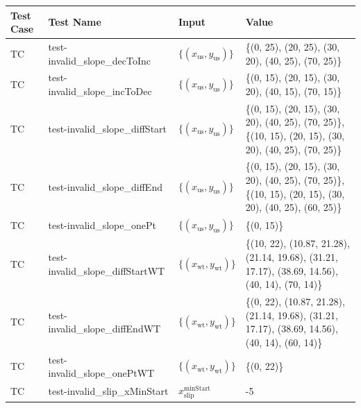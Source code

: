 \documentclass[12pt, titlepage]{article}
\newcounter{testnum} %
\begin{document}
\begin{longtable}{  l  p{5cm}  l  p{5cm}  }
	\hline
	\textbf{Test Case} & \textbf{Test Name} & \textbf{Input} & \textbf{Value} \\
	\hline
	TC{testnum}\thetestnum \label{TC_InvalidSlopeDecToInc} & 
	test-invalid\_slope\_decToInc & 
	$\{\left(x_\text{us},y_\text{us}\right)\}$ & \{(0, 25), (20, 25), (30, 20), 
	(40, 25), 
	(70, 25)\}\\ 
	\hline
	TC{testnum}\thetestnum \label{TC_InvalidSlopeIncToDec} & 
	test-invalid\_slope\_incToDec & 
	$\{\left(x_\text{us},y_\text{us}\right)\}$ & \{(0, 15), (20, 15), (30, 20), 
	(40, 15), 
	(70, 15)\}\\ 
	\hline
	TC{testnum}\thetestnum \label{TC_InvalidSlopeDiffStart} & 
	test-invalid\_slope\_diffStart & 
	$\{\left(x_\text{us},y_\text{us}\right)\}$ & \{(0, 15), (20, 15), (30, 20), 
	(40, 25), 
	(70, 25)\}, \{(10, 15), (20, 15), (30, 20), (40, 25), (70, 25)\}\\ 
	\hline
	TC{testnum}\thetestnum \label{TC_InvalidSlopeDiffEnd} & 
	test-invalid\_slope\_diffEnd & 
	$\{\left(x_\text{us},y_\text{us}\right)\}$ & \{(0, 15), (20, 15), (30, 20), 
	(40, 25), 
	(70, 25)\}, \{(10, 15), (20, 15), (30, 20), (40, 25), (60, 25)\}\\ 
	\hline
	TC{testnum}\thetestnum \label{TC_InvalidSlopeOnePt} & 
	test-invalid\_slope\_onePt & 
	$\{\left(x_\text{us},y_\text{us}\right)\}$ & \{(0, 15)\}\\ 
	\hline
	TC{testnum}\thetestnum \label{TC_InvalidSlopeDiffStartWT} & 
	test-invalid\_slope\_diffStartWT & 
	$\{\left(x_\text{wt},y_\text{wt}\right)\}$ & \{(10, 22), (10.87, 21.28), 
	(21.14, 
	19.68), (31.21, 17.17), (38.69, 14.56), (40, 14), (70, 14)\}\\ 
	\hline
	TC{testnum}\thetestnum \label{TC_InvalidSlopeDiffEndWT} & 
	test-invalid\_slope\_diffEndWT & 
	$\{\left(x_\text{wt},y_\text{wt}\right)\}$ & \{(0, 22), (10.87, 21.28), 
	(21.14, 
	19.68), (31.21, 17.17), (38.69, 14.56), (40, 14), (60, 14)\}\\ 
	\hline
	TC{testnum}\thetestnum \label{TC_InvalidSlopeOnePtWT} & 
	test-invalid\_slope\_onePtWT & 
	$\{\left(x_\text{wt},y_\text{wt}\right)\}$ & \{(0, 22)\}\\ 
	\hline
	TC{testnum}\thetestnum \label{TC_InvalidSlipXMinStart} & 
	test-invalid\_slip\_xMinStart & ${x_\text{slip}^\text{minStart}}$ & -5\\ 

\end{longtable}
\end{document}
